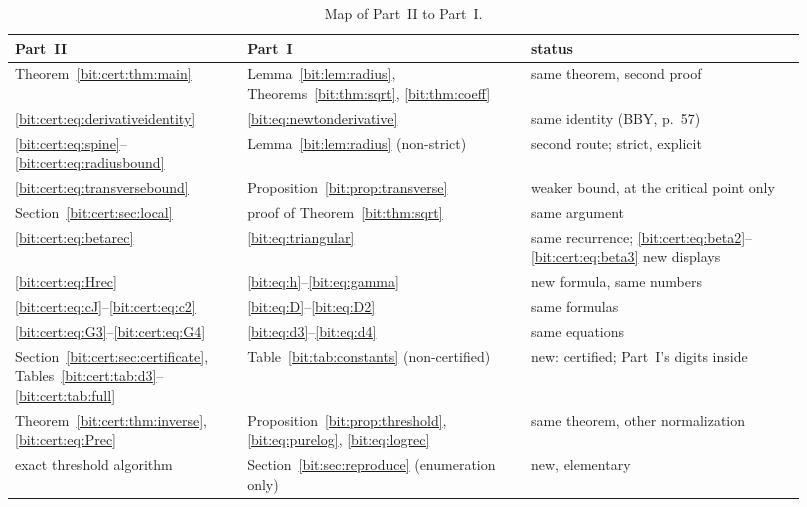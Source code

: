 \documentclass[11pt]{article}
\theoremstyle{definition}\newtheorem{definition}[theorem]{Definition}
\theoremstyle{remark}\newtheorem{remark}[theorem]{Remark}
\begin{document}
\begin{table}[htbp]
\centering\footnotesize
\begin{tabular}{@{}>{\raggedright\arraybackslash}p{0.27\linewidth}>{\raggedright\arraybackslash}p{0.33\linewidth}>{\raggedright\arraybackslash}p{0.32\linewidth}@{}}
\toprule
Part~II & Part~I & status\\
\midrule
Theorem~\ref{bit:cert:thm:main} & Lemma~\ref{bit:lem:radius}, Theorems~\ref{bit:thm:sqrt}, \ref{bit:thm:coeff} & same theorem, second proof\\
\eqref{bit:cert:eq:derivativeidentity} & \eqref{bit:eq:newtonderivative} & same identity (BBY, p.~57)\\
\eqref{bit:cert:eq:spine}--\eqref{bit:cert:eq:radiusbound} & Lemma~\ref{bit:lem:radius} (non-strict) & second route; strict, explicit\\
\eqref{bit:cert:eq:transversebound} & Proposition~\ref{bit:prop:transverse} & weaker bound, at the critical point only\\
Section~\ref{bit:cert:sec:local} & proof of Theorem~\ref{bit:thm:sqrt} & same argument\\
\eqref{bit:cert:eq:betarec} & \eqref{bit:eq:triangular} & same recurrence; \eqref{bit:cert:eq:beta2}--\eqref{bit:cert:eq:beta3} new displays\\
\eqref{bit:cert:eq:Hrec} & \eqref{bit:eq:h}--\eqref{bit:eq:gamma} & new formula, same numbers\\
\eqref{bit:cert:eq:cJ}--\eqref{bit:cert:eq:c2} & \eqref{bit:eq:D}--\eqref{bit:eq:D2} & same formulas\\
\eqref{bit:cert:eq:G3}--\eqref{bit:cert:eq:G4} & \eqref{bit:eq:d3}--\eqref{bit:eq:d4} & same equations\\
Section~\ref{bit:cert:sec:certificate}, Tables~\ref{bit:cert:tab:d3}--\ref{bit:cert:tab:full} & Table~\ref{bit:tab:constants} (non-certified) & new: certified; Part~I's digits inside\\
Theorem~\ref{bit:cert:thm:inverse}, \eqref{bit:cert:eq:Prec} & Proposition~\ref{bit:prop:threshold}, \eqref{bit:eq:purelog}, \eqref{bit:eq:logrec} & same theorem, other normalization\\
exact threshold algorithm & Section~\ref{bit:sec:reproduce} (enumeration only) & new, elementary\\
\bottomrule
\end{tabular}
\caption{Map of Part~II to Part~I.}\label{bit:cert:tab:map}
\end{table}
\end{document}

